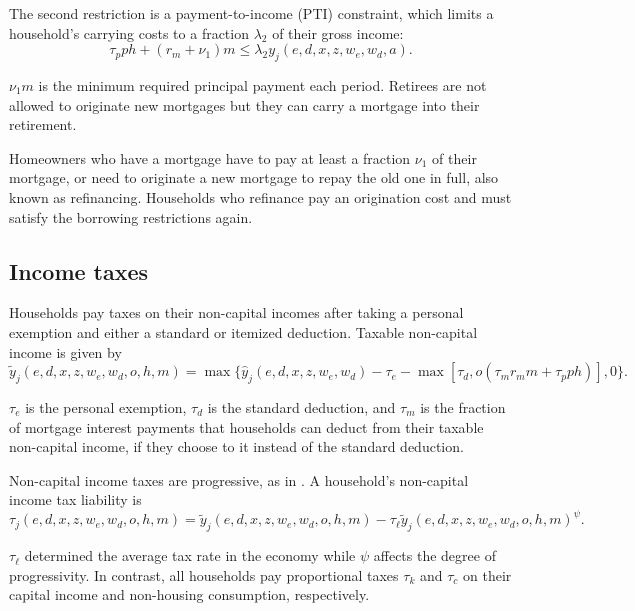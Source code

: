 \documentclass[parskip=full]{article}
\begin{document}
\noindent The second restriction is a payment-to-income (PTI) constraint, which limits a household's carrying costs to a fraction $\lambda_{2}$ of their gross income:
\begin{equation}
\label{eq:gds}
\tau_p ph + (r_m + \nu_1) m\leq \lambda_{2}y_{j}(e,d,x,z,w_{e},w_{d},a).
\end{equation}

\noindent $\nu_1 m$ is the minimum required principal payment each period. Retirees are not allowed to originate new mortgages but they can carry a mortgage into their retirement.

Homeowners who have a mortgage have to pay at least a fraction $\nu_1$ of their mortgage, or need to originate a new mortgage to repay the old one in full, also known as refinancing. Households who refinance pay an origination cost and must satisfy the borrowing restrictions again.

\subsection{Income taxes}
Households pay taxes on their non-capital incomes after taking a personal exemption and either a standard or itemized deduction. Taxable non-capital income is given by 
\begin{equation}
    \tilde{y}_{j}(e,d,x,z,w_{e},w_{d},o,h,m) = \max\{\hat{y}_{j}(e,d,x,z,w_{e},w_{d})-\tau_e-\max[\tau_d,o(\tau_m r_m m + \tau_p ph)],0\}.
\end{equation}

\noindent $\tau_e$ is the personal exemption, $\tau_d$ is the standard deduction, and $\tau_m$ is the fraction of mortgage interest payments that households can deduct from their taxable non-capital income, if they choose to it instead of the standard deduction. 

Non-capital income taxes are progressive, as in \citet{hsv-2020}. A household's non-capital income tax liability is
\begin{equation}
    \tau_{j}(e,d,x,z,w_{e},w_{d},o,h,m) = \tilde{y}_j(e,d,x,z,w_{e},w_{d},o,h,m) - \tau_\ell \tilde{y}_j(e,d,x,z,w_{e},w_{d},o,h,m)^\psi.
\end{equation}

\noindent $\tau_{\ell}$ determined the average tax rate in the economy while $\psi$ affects the degree of progressivity. In contrast, all households pay proportional taxes $\tau_{k}$ and $\tau_{c}$ on their capital income and non-housing consumption, respectively.
\end{document}
